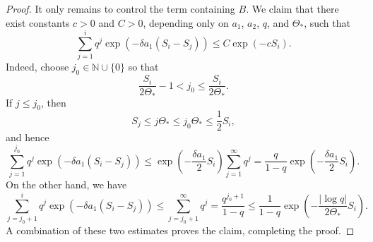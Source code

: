 \documentclass[10pt,a4paper]{amsart}
\begin{document}
\begin{proof}
    It only remains to control the term containing $B$. We claim that there exist constants $c>0$ and $C>0$, depending only on $a_1$, $a_2$, $q$, and $\Theta_\ast$, such that
    \begin{equation*}
        \sum_{j=1}^i q^j \exp\left(-\delta a_1 (S_i-S_j)\right) \leq C \exp \left(-c S_i \right).
    \end{equation*}
    Indeed, choose $j_0 \in \mathbb N \cup \{0\}$ so that 
    \begin{equation*}
       \frac{S_i}{2\Theta_{\ast}}-1 < j_0 \leq \frac{S_i}{2\Theta_{\ast}}.
    \end{equation*}
    If $j \leq j_0$, then 
    \begin{equation*}
       S_j \leq j \Theta_{\ast} \leq  j_0 \Theta_{\ast} \leq \frac{1}{2}S_i,
    \end{equation*}
    and hence
    \begin{equation*}
        \sum_{j=1}^{j_0} q^j \exp\left(-\delta a_1 (S_i-S_j)\right) \leq \exp\left(-\frac{\delta a_1}{2} S_i\right) \sum_{j=1}^{\infty}q^j=\frac{q}{1-q}\exp\left(-\frac{\delta a_1}{2}S_i\right).
    \end{equation*}
    On the other hand, we have
    \begin{equation*}
        \sum_{j=j_0+1}^i q^j \exp\left(-\delta a_1 (S_i-S_j)\right) \leq \sum_{j=j_0+1}^{\infty} q^j = \frac{q^{j_0+1}}{1-q} \leq \frac{1}{1-q} \exp\left(-\frac{|\log q|}{2\Theta_{\ast}}S_i \right).
    \end{equation*}
    A combination of these two estimates proves the claim, completing the proof.
\end{proof}
\end{document}
